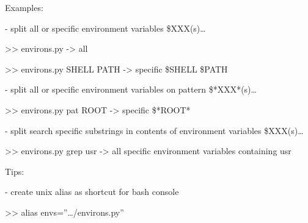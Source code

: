 \documentclass[a4paper,10pt,english]{sphinxmanual}
\begin{document}
\begin{DUlineblock}{0em}
\item[] Examples: 
\item[] - split all or specific environment variables \$XXX(s)…
\item[]
\begin{DUlineblock}{\DUlineblockindent}
\item[] \textgreater{}\textgreater{} environs.py -\textgreater{} all
\item[] \textgreater{}\textgreater{} environs.py SHELL PATH -\textgreater{} specific \$SHELL \$PATH
\item[] 
\end{DUlineblock}
\item[] - split all or specific environment variables on pattern \$*XXX*(s)…
\item[]
\begin{DUlineblock}{\DUlineblockindent}
\item[] \textgreater{}\textgreater{} environs.py \textendash{}pat ROOT -\textgreater{} specific \$*ROOT* 
\item[] 
\end{DUlineblock}
\item[] - split search specific substrings in contents of environment variables \$XXX(s)…
\item[]
\begin{DUlineblock}{\DUlineblockindent}
\item[] \textgreater{}\textgreater{} environs.py \textendash{}grep usr  -\textgreater{} all specific environment variables containing usr
\item[] 
\end{DUlineblock}
\item[] Tips:
\item[] - create unix alias as shortcut for bash console
\item[]
\begin{DUlineblock}{\DUlineblockindent}
\item[] \textgreater{}\textgreater{} alias envs=”…/environs.py”
\end{DUlineblock}
\end{DUlineblock}

\begin{fulllineitems}
\label{\detokenize{apidoc_src/src:src.environs.print_grep_environs}}
\end{fulllineitems}
\end{document}
